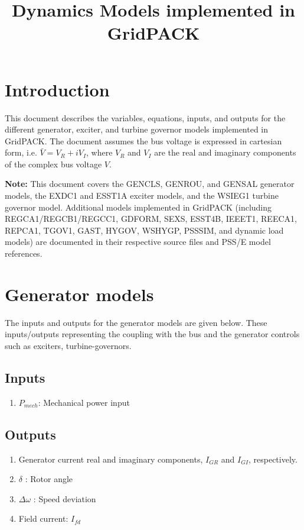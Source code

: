 \documentclass[12pt]{article}
\newcommand{\dw}{\Delta\omega}
\newcommand{\Pm}{P_{mech}}
\newcommand{\Ifd}{I_{fd}}
\begin{document}

\title{Dynamics Models implemented in GridPACK}

\maketitle

\section{Introduction}
This document describes the variables, equations, inputs, and outputs for the different generator, exciter, and turbine governor models implemented in GridPACK.
The document assumes the bus voltage is expressed in cartesian form, i.e. $\bar{V} = V_R + iV_I$, where
$V_R$ and $V_I$ are the real and imaginary components of the complex bus voltage $V$.

\textbf{Note:} This document covers the GENCLS, GENROU, and GENSAL generator models, the EXDC1 and ESST1A exciter models, and the WSIEG1 turbine governor model. Additional models implemented in GridPACK (including REGCA1/REGCB1/REGCC1, GDFORM, SEXS, ESST4B, IEEET1, REECA1, REPCA1, TGOV1, GAST, HYGOV, WSHYGP, PSSSIM, and dynamic load models) are documented in their respective source files and PSS/E model references.

\section{Generator models}
The inputs and outputs for the generator models are given below. These inputs/outputs representing
the coupling with the bus and the generator controls such as exciters, turbine-governors.
\subsection{Inputs}
\begin{enumerate}
  \item $\Pm$: Mechanical power input
\end{enumerate}

\subsection{Outputs}
\begin{enumerate}
  \item Generator current real and imaginary components, $I_{GR}$ and $I_{GI}$, respectively.
  \item $\delta$ : Rotor angle
  \item $\dw$ : Speed deviation
  \item Field current: $\Ifd$
\end{enumerate}
\end{document}
